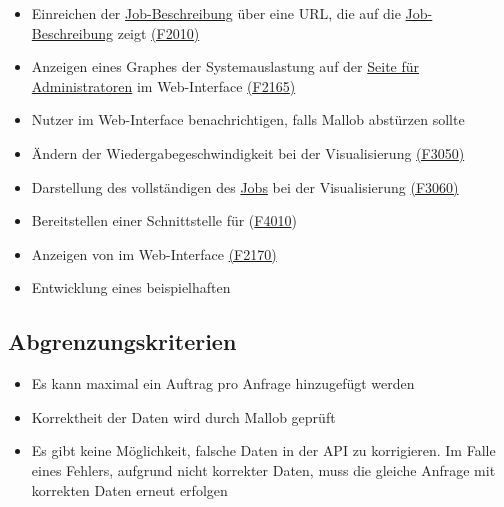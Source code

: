 \begin{itemize}[noitemsep]
        \item Einreichen der \hyperref[B:Job-Beschreibung]{Job-Beschreibung} über eine \gls{URL}, die auf die \hyperref[B:Job-Beschreibung]{Job-Beschreibung} zeigt \hyperref[FA:Web-Interface:Job einreichen]{(F2010)}
        \item Anzeigen eines Graphes der Systemauslastung auf der \hyperref[pages:admin]{Seite für Administratoren} im \gls{Web-Interface} \hyperref[FA:Web-Interface:Anzeigen von Diagnosedaten]{(F2165)}
        \item \gls{Nutzer} im \gls{Web-Interface} benachrichtigen, falls \gls{Mallob} abstürzen sollte 
        \item Ändern der Wiedergabegeschwindigkeit bei der Visualisierung \hyperref[FA:Visualisierung:Aendern der Wiedergabegeschwindigkeit]{(F3050)}
        \item Darstellung des vollständigen  des \hyperref[B:Jobs]{Jobs} bei der Visualisierung \hyperref[FA:Visualisierung:Anzeigen des Binaerbaumes für einen Job]{(F3060)}
        \item Bereitstellen einer Schnittstelle für  (\hyperref[FA:System:Schnittstelle für Plugins]{F4010})
        \item Anzeigen von  im \gls{Web-Interface} \hyperref[FA:Web-Interface:Anzeigen von Plugins]{(F2170)}
        \item Entwicklung eines beispielhaften 
    \end{itemize}
    
\subsection{Abgrenzungskriterien}
    \begin{itemize}[noitemsep]
        \item Es kann maximal ein Auftrag pro Anfrage hinzugefügt werden
        \item Korrektheit der Daten wird durch \gls{Mallob} geprüft
        \item Es gibt keine Möglichkeit, falsche Daten in der \gls{API} zu korrigieren. Im Falle eines Fehlers, aufgrund nicht korrekter Daten, muss die gleiche Anfrage mit korrekten Daten erneut erfolgen
    \end{itemize}
